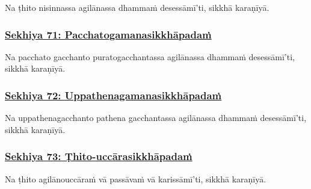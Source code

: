 Na ṭhito nisinnassa agilānassa dhammaṁ desessāmī'ti, sikkhā karaṇīyā.\makeatletter\hyperlink{endnote520-appendix}\makeatother \thinspace



\subsubsection*{\hyperref[training71]{Sekhiya 71: Pacchatogamanasikkhāpadaṁ}}
\label{sekh71}

Na pacchato gacchanto purato\makeatletter\hyperlink{endnote521-appendix}\makeatother \thinspace gacchantassa agilānassa dhammaṁ desessāmī'ti, sikkhā karaṇīyā.



\subsubsection*{\hyperref[training72]{Sekhiya 72: Uppathenagamanasikkhāpadaṁ}}
\label{sekh72}

Na uppathena\makeatletter\hyperlink{endnote522-appendix}\makeatother \thinspace gacchanto pathena gacchantassa agilānassa dhammaṁ desessāmī'ti, sikkhā karaṇīyā.\makeatletter\hyperlink{endnote523-appendix}\makeatother \thinspace



\subsubsection*{\hyperref[training73]{Sekhiya 73: Ṭhito-uccārasikkhāpadaṁ}}
\label{sekh73}

Na ṭhito agilāno\makeatletter\hyperlink{endnote524-appendix}\makeatother \thinspace uccāraṁ vā passāvaṁ vā karissāmī'ti, sikkhā karaṇīyā.



